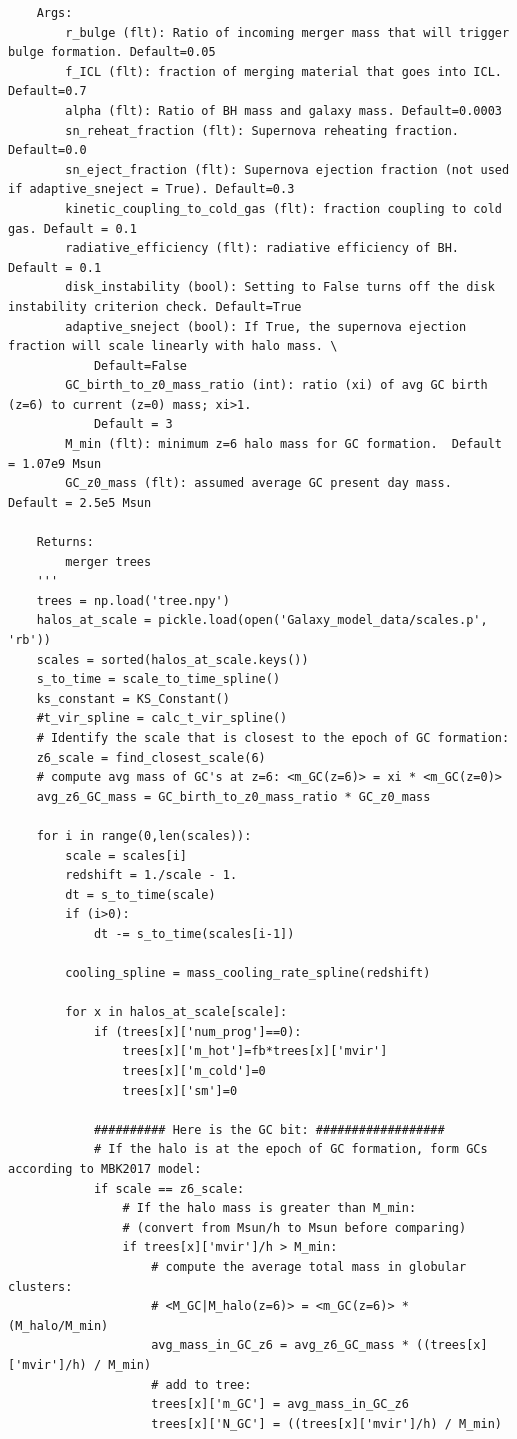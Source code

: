 \documentclass[onecolumn]{aastex62}
\begin{document}
\begin{verbatim}
    Args: 
        r_bulge (flt): Ratio of incoming merger mass that will trigger bulge formation. Default=0.05
        f_ICL (flt): fraction of merging material that goes into ICL. Default=0.7
        alpha (flt): Ratio of BH mass and galaxy mass. Default=0.0003
        sn_reheat_fraction (flt): Supernova reheating fraction. Default=0.0
        sn_eject_fraction (flt): Supernova ejection fraction (not used if adaptive_sneject = True). Default=0.3
        kinetic_coupling_to_cold_gas (flt): fraction coupling to cold gas. Default = 0.1
        radiative_efficiency (flt): radiative efficiency of BH. Default = 0.1
        disk_instability (bool): Setting to False turns off the disk instability criterion check. Default=True
        adaptive_sneject (bool): If True, the supernova ejection fraction will scale linearly with halo mass. \
            Default=False
        GC_birth_to_z0_mass_ratio (int): ratio (xi) of avg GC birth (z=6) to current (z=0) mass; xi>1.
            Default = 3
        M_min (flt): minimum z=6 halo mass for GC formation.  Default = 1.07e9 Msun
        GC_z0_mass (flt): assumed average GC present day mass.  Default = 2.5e5 Msun
        
    Returns:
        merger trees
    '''
    trees = np.load('tree.npy')
    halos_at_scale = pickle.load(open('Galaxy_model_data/scales.p', 'rb'))
    scales = sorted(halos_at_scale.keys())
    s_to_time = scale_to_time_spline()
    ks_constant = KS_Constant()
    #t_vir_spline = calc_t_vir_spline()
    # Identify the scale that is closest to the epoch of GC formation:
    z6_scale = find_closest_scale(6)
    # compute avg mass of GC's at z=6: <m_GC(z=6)> = xi * <m_GC(z=0)>
    avg_z6_GC_mass = GC_birth_to_z0_mass_ratio * GC_z0_mass

    for i in range(0,len(scales)):
        scale = scales[i]
        redshift = 1./scale - 1.
        dt = s_to_time(scale)
        if (i>0):
            dt -= s_to_time(scales[i-1])
                        
        cooling_spline = mass_cooling_rate_spline(redshift) 

        for x in halos_at_scale[scale]:
            if (trees[x]['num_prog']==0): 
                trees[x]['m_hot']=fb*trees[x]['mvir']
                trees[x]['m_cold']=0
                trees[x]['sm']=0
            
            ########## Here is the GC bit: ##################
            # If the halo is at the epoch of GC formation, form GCs according to MBK2017 model:
            if scale == z6_scale:
                # If the halo mass is greater than M_min:
                # (convert from Msun/h to Msun before comparing)
                if trees[x]['mvir']/h > M_min:
                    # compute the average total mass in globular clusters:
                    # <M_GC|M_halo(z=6)> = <m_GC(z=6)> * (M_halo/M_min)
                    avg_mass_in_GC_z6 = avg_z6_GC_mass * ((trees[x]['mvir']/h) / M_min)
                    # add to tree:
                    trees[x]['m_GC'] = avg_mass_in_GC_z6
                    trees[x]['N_GC'] = ((trees[x]['mvir']/h) / M_min)


\end{verbatim}
\end{document}
